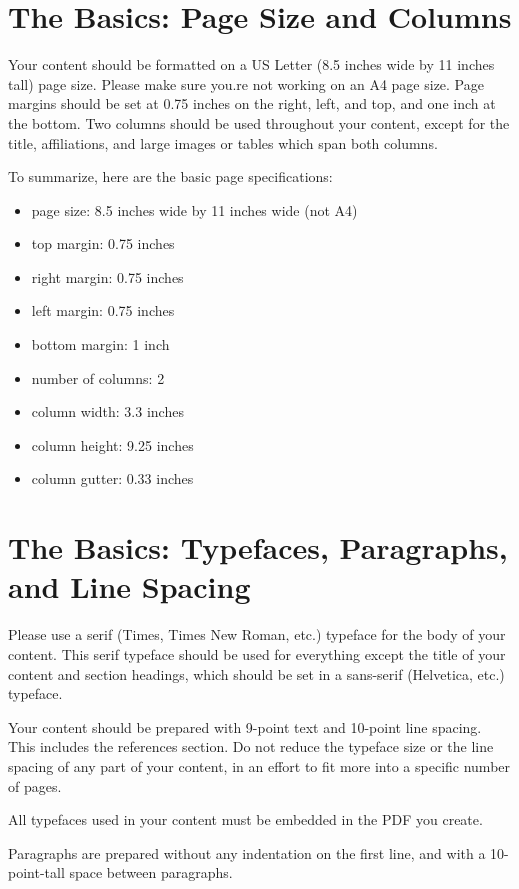 \documentclass[tog]{acmsiggraph}
\begin{document}
\section{The Basics: Page Size and Columns}

Your content should be formatted on a US Letter (8.5 inches wide by 11
inches tall) page size. Please make sure you.re not working on an A4
page size. Page margins should be set at 0.75 inches on the right,
left, and top, and one inch at the bottom. Two columns should be used
throughout your content, except for the title, affiliations, and large
images or tables which span both columns.

To summarize, here are the basic page specifications: 
\begin{itemize}
\item page size: 8.5 inches wide by 11 inches wide (not A4)
\item top margin: 0.75 inches
\item right margin: 0.75 inches
\item left margin: 0.75 inches
\item bottom margin: 1 inch
\item number of columns: 2
\item column width: 3.3 inches
\item column height: 9.25 inches
\item column gutter: 0.33 inches
\end{itemize}

\section{The Basics: Typefaces, Paragraphs, and Line Spacing}

Please use a serif (Times, Times New Roman, etc.) typeface for the
body of your content. This serif typeface should be used for
everything except the title of your content and section headings,
which should be set in a sans-serif (Helvetica, etc.) typeface.

Your content should be prepared with 9-point text and 10-point line
spacing. This includes the references section. Do not reduce the
typeface size or the line spacing of any part of your content, in an
effort to fit more into a specific number of pages. 

All typefaces used in your content must be embedded in the PDF you
create. 

Paragraphs are prepared without any indentation on the first line, and
with a 10-point-tall space between paragraphs.
\end{document}
